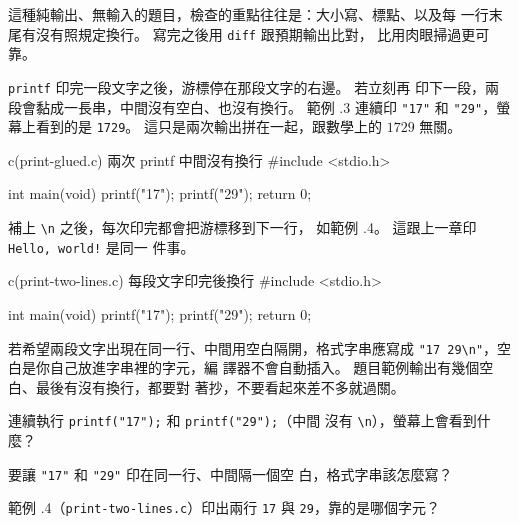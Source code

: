 這種純輸出、無輸入的題目，檢查的重點往往是：大小寫、標點、以及每
一行末尾有沒有照規定換行。 寫完之後用 \texttt{diff} 跟預期輸出比對，
比用肉眼掃過更可靠。

\texttt{printf} 印完一段文字之後，游標停在那段文字的右邊。 若立刻再
印下一段，兩段會黏成一長串，中間沒有空白、也沒有換行。 範例
\thechapter.3 連續印 \texttt{"17"} 和 \texttt{"29"}，螢幕上看到的是
\texttt{1729}。 這只是兩次輸出拼在一起，跟數學上的 $1729$ 無關。

\begin{example}{c}{(print-glued.c) 兩次 printf 中間沒有換行}
#include <stdio.h>

int main(void) {
    printf("17");
    printf("29");
    return 0;
}
\end{example}


補上 \texttt{\textbackslash n} 之後，每次印完都會把游標移到下一行，
如範例 \thechapter.4。 這跟上一章印 \texttt{Hello, world!} 是同一
件事。

\begin{example}{c}{(print-two-lines.c) 每段文字印完後換行}
#include <stdio.h>

int main(void) {
    printf("17\n");
    printf("29\n");
    return 0;
}
\end{example}


若希望兩段文字出現在同一行、中間用空白隔開，格式字串應寫成
\texttt{"17 29\textbackslash n"}，空白是你自己放進字串裡的字元，編
譯器不會自動插入。 題目範例輸出有幾個空白、最後有沒有換行，都要對
著抄，不要看起來差不多就過關。


\begin{drills}[label=drills:basic-printf]
\item 連續執行 \texttt{printf("17");} 和 \texttt{printf("29");}（中間
沒有 \texttt{\textbackslash n}），螢幕上會看到什麼？
\item 要讓 \texttt{"17"} 和 \texttt{"29"} 印在同一行、中間隔一個空
白，格式字串該怎麼寫？
\item 範例 \thechapter.4（\texttt{print-two-lines.c}）印出兩行
\texttt{17} 與 \texttt{29}，靠的是哪個字元？
\end{drills}

